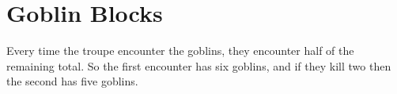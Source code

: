 \pagebreak[4]

\section{Goblin Blocks}

\label{goblinBlocks}

Every time the troupe encounter the goblins, they encounter half of the remaining total.
So the first encounter has six goblins, and if they kill two then the second has five goblins.

\begin{multicols}{2}







\end{multicols}
